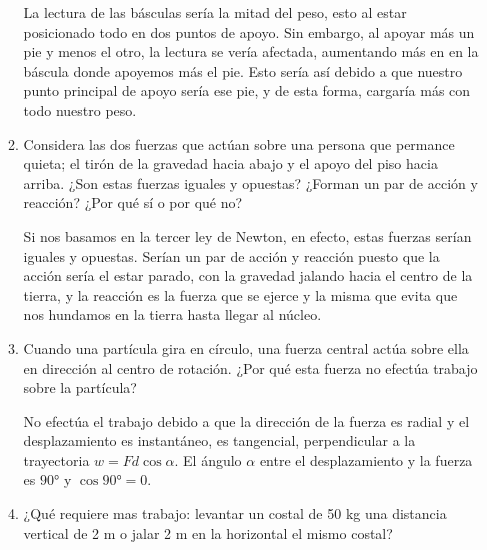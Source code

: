 \documentclass[10pt, a4paper]{article}
\begin{document}
\begin{enumerate}
\begin{enumerate}
            \begin{center}
                La lectura de las básculas sería la mitad del peso, esto al estar posicionado todo en 
                dos puntos de apoyo. Sin embargo, al apoyar más un pie y menos el otro, la lectura se vería
                afectada, aumentando más en en la báscula donde apoyemos más el pie. Esto sería así
                debido a que nuestro punto principal de apoyo sería ese pie, y de esta forma, cargaría más
                con todo nuestro peso.
            \end{center}

            \item Considera las dos fuerzas que actúan sobre una persona que permance quieta;
            el tirón de la gravedad hacia abajo y el apoyo del piso hacia arriba. ¿Son estas
            fuerzas iguales y opuestas? ¿Forman un par de acción y reacción? ¿Por qué sí o
            por qué no?

            \begin{center}
                Si nos basamos en la tercer ley de Newton, en efecto, estas fuerzas serían iguales y opuestas.
                Serían un par de acción y reacción puesto que la acción sería el estar parado, con la gravedad
                jalando hacia el centro de la tierra, y la reacción es la fuerza que se ejerce y la misma que
                evita que nos hundamos en la tierra hasta llegar al núcleo.
            \end{center}

            \item Cuando una partícula gira en círculo, una fuerza central actúa sobre ella en
            dirección al centro de rotación. ¿Por qué esta fuerza no efectúa trabajo sobre la
            partícula?

            \begin{center}
                No efectúa el trabajo debido a que la dirección de la fuerza es radial y el desplazamiento
                es instantáneo, es tangencial, perpendicular a la trayectoria $w=Fd\cos\alpha$. El ángulo
                $\alpha$ entre el desplazamiento y la fuerza es $\ang{90}$ y $\cos\ang{90}=0$.
            \end{center}

            \item ¿Qué requiere mas trabajo: levantar un costal de 50 kg una distancia vertical de
            2 m o jalar 2 m en la horizontal el mismo costal?


\end{enumerate}
\end{enumerate}
\end{document}
